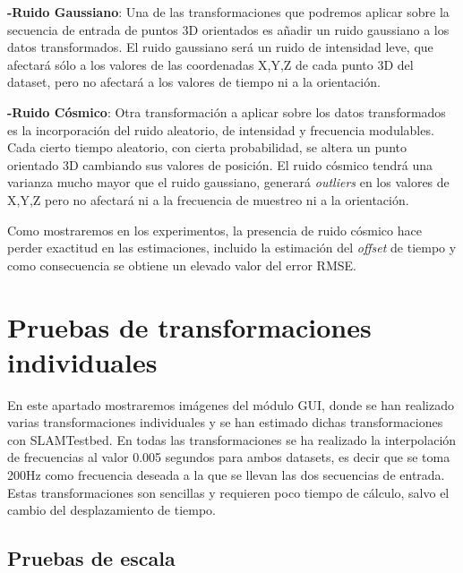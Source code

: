 \textbf{-Ruido Gaussiano}: Una de las transformaciones que podremos aplicar sobre la secuencia de entrada de puntos 3D orientados es añadir un ruido gaussiano a los datos transformados. El ruido gaussiano será un ruido de intensidad leve, que afectará sólo a los valores de las coordenadas X,Y,Z de cada punto 3D del dataset, pero no afectará a los valores de tiempo ni a la orientación.

\textbf{-Ruido Cósmico}: Otra transformación a aplicar sobre los datos transformados es la incorporación del ruido aleatorio, de intensidad y frecuencia modulables. Cada cierto tiempo aleatorio, con cierta probabilidad, se altera un punto orientado 3D cambiando sus valores de posición. El ruido cósmico tendrá una varianza mucho mayor que el ruido gaussiano, generará \textit{outliers} en los valores de X,Y,Z pero no afectará ni a la frecuencia de muestreo ni a la orientación. 

Como mostraremos en los experimentos, la presencia de ruido cósmico hace perder exactitud en las estimaciones, incluido la estimación del \textit{offset} de tiempo y como consecuencia se obtiene un elevado valor del error RMSE.


\section{Pruebas de transformaciones individuales}

En este apartado mostraremos imágenes del módulo GUI, donde se han realizado varias transformaciones individuales y se han estimado dichas transformaciones con SLAMTestbed.
En todas las transformaciones se ha realizado la interpolación de frecuencias al valor 0.005 segundos para ambos datasets, es decir que se toma 200Hz como frecuencia deseada a la que se llevan las dos secuencias de entrada. Estas transformaciones son sencillas y requieren poco tiempo de cálculo, salvo el cambio del desplazamiento de tiempo.

\subsection{Pruebas de escala}

